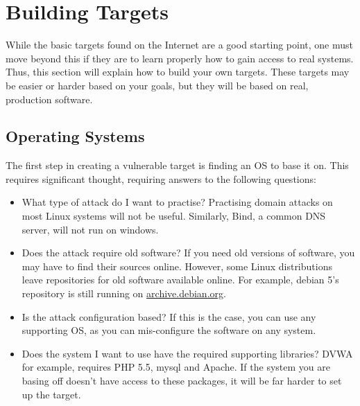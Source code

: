 	\section{Building Targets}
		While the basic targets found on the Internet are a good starting point, one must move beyond this if they are to learn properly how to gain access to real systems. 
		Thus, this section will explain how to build your own targets. 
		These targets may be easier or harder based on your goals, but they will be based on real, production software. 

		\subsection{Operating Systems}
			The first step in creating a vulnerable target is finding an OS to base it on. 
			This requires significant thought, requiring answers to the following questions:
			\begin{itemize}
				\item What type of attack do I want to practise?
					Practising domain attacks on most Linux systems will not be useful. 
					Similarly, Bind, a common DNS server, will not run on windows. 
				\item Does the attack require old software?
					If you need old versions of software, you may have to find their sources online. 
					However, some Linux distributions leave repositories for old software available online. 
					For example, debian 5's repository is still running on \url{archive.debian.org}.
				\item Is the attack configuration based?
					If this is the case, you can use any supporting OS, as you can mis-configure the software on any system. 
				\item Does the system I want to use have the required supporting libraries?
					DVWA for example, requires PHP 5.5, mysql and Apache. 
					If the system you are basing off doesn't have access to these packages, it will be far harder to set up the target. 
			\end{itemize}
